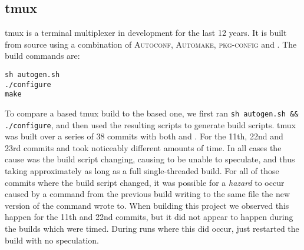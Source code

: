 
\subsection{tmux}
\label{sec:eval:tmux}



tmux is a terminal multiplexer in development for the last 12 years.  It is built from source using a combination of \textsc{Autoconf}, \textsc{Automake}, \textsc{pkg-config} and \Make.  The build commands are:

\begin{verbatim}
sh autogen.sh
./configure
make
\end{verbatim}

To compare a \Rattle based tmux build to the \Make based one, we first ran \texttt{sh autogen.sh \&\& ./configure}, and then used the resulting \Make scripts to generate \Rattle build scripts. tmux was built over a series of 38 commits with both \Make and \Rattle. For the 11th, 22nd and 23rd commits \Rattle and \Make took noticeably different amounts of time. In all cases the cause was the build script changing, causing \Rattle to be unable to speculate, and thus taking approximately as long as a full single-threaded build.  For all of those commits where the build script changed, it was possible for a \emph{hazard} to occur caused by a command from the previous build writing to the same file the new version of the command wrote to.  When building this project we observed this happen for the 11th and 22nd commits, but it did not appear to happen during the builds which were timed.  During runs where this did occur, \Rattle just restarted the build with no speculation.

